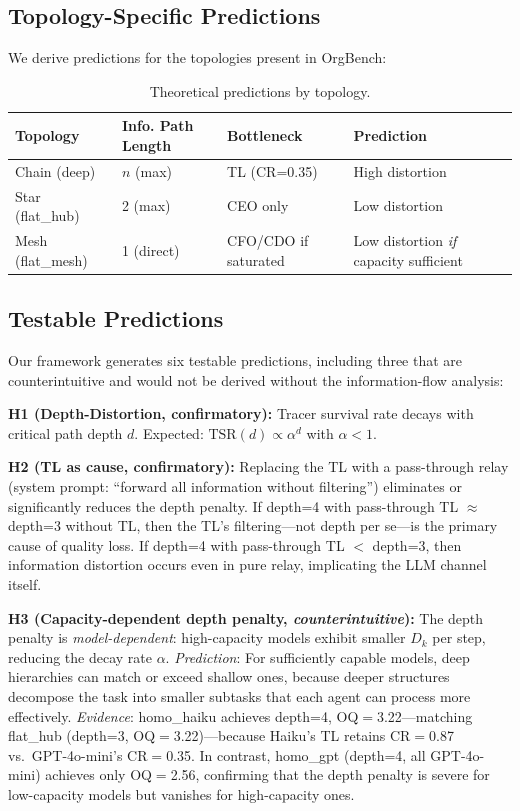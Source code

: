 \documentclass[conference]{IEEEtran}
\begin{document}
\subsection{Topology-Specific Predictions}
\label{subsec:predictions}

We derive predictions for the topologies present in OrgBench:

\begin{table}[t]
\centering
\caption{Theoretical predictions by topology.}
\label{tab:predictions}
\small
\begin{tabular}{p{1.5cm}p{2.2cm}p{1.5cm}p{2cm}}
\toprule
\textbf{Topology} & \textbf{Info. Path Length} & \textbf{Bottleneck} & \textbf{Prediction} \\
\midrule
Chain (deep) & $n$ (max) & TL (CR=0.35) & High distortion \\
Star (flat\_hub) & 2 (max) & CEO only & Low distortion \\
Mesh (flat\_mesh) & 1 (direct) & CFO/CDO if saturated & Low distortion \emph{if} capacity sufficient \\
\bottomrule
\end{tabular}
\end{table}

\subsection{Testable Predictions}
\label{subsec:testable}

Our framework generates six testable predictions, including three that are counterintuitive and would not be derived without the information-flow analysis:

\textbf{H1 (Depth-Distortion, confirmatory):}
Tracer survival rate decays with critical path depth $d$.
Expected: $\text{TSR}(d) \propto \alpha^d$ with $\alpha < 1$.

\textbf{H2 (TL as cause, confirmatory):}
Replacing the TL with a pass-through relay (system prompt: ``forward all information without filtering'') eliminates or significantly reduces the depth penalty.
If depth=4 with pass-through TL $\approx$ depth=3 without TL, then the TL's filtering---not depth per se---is the primary cause of quality loss.
If depth=4 with pass-through TL $<$ depth=3, then information distortion occurs even in pure relay, implicating the LLM channel itself.

\textbf{H3 (Capacity-dependent depth penalty, \emph{counterintuitive}):}
The depth penalty is \emph{model-dependent}: high-capacity models exhibit smaller $D_k$ per step, reducing the decay rate $\alpha$.
\emph{Prediction}: For sufficiently capable models, deep hierarchies can match or exceed shallow ones, because deeper structures decompose the task into smaller subtasks that each agent can process more effectively.
\emph{Evidence}: homo\_haiku achieves depth=4, OQ$=$3.22---matching flat\_hub (depth=3, OQ$=$3.22)---because Haiku's TL retains CR$=$0.87 vs.\ GPT-4o-mini's CR$=$0.35.
In contrast, homo\_gpt (depth=4, all GPT-4o-mini) achieves only OQ$=$2.56, confirming that the depth penalty is severe for low-capacity models but vanishes for high-capacity ones.
\end{document}
